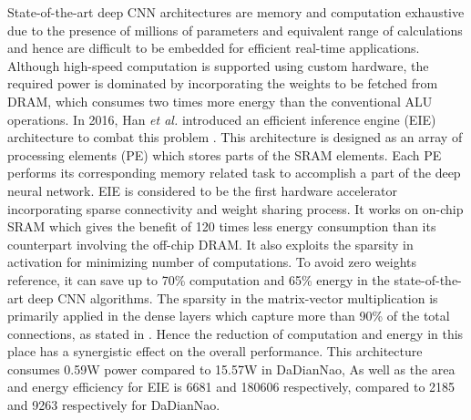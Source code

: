 \documentclass[journal]{IEEEtran}
\begin{document}
\par State-of-the-art deep CNN architectures are memory and computation exhaustive due to the presence of millions of parameters and equivalent range of calculations and hence are difficult to be embedded for efficient real-time applications. Although high-speed computation is supported using custom hardware, the required power is dominated by incorporating the weights to be fetched from DRAM, which consumes two times more energy than the conventional ALU operations. In 2016, Han \textit{et al.} introduced an efficient inference engine (EIE) architecture to combat this problem \cite{paper24}. This architecture is designed as an array of processing elements (PE) which stores parts of the SRAM elements. Each PE performs its corresponding memory related task to accomplish a part of the deep neural network. EIE is considered to be the first hardware accelerator incorporating sparse connectivity and weight sharing process. It works on on-chip SRAM which gives the benefit of 120 times less energy consumption than its counterpart involving the off-chip DRAM. It also exploits the sparsity in activation for minimizing number of computations. To avoid zero weights reference, it can save up to 70\% computation and 65\% energy in the state-of-the-art deep CNN algorithms. The sparsity in the matrix-vector multiplication is primarily applied in the dense layers which capture more than 90\% of the total connections, as stated in \cite{paper6}. Hence the reduction of computation and energy in this place has a synergistic effect on the overall performance. This architecture consumes 0.59W power compared to 15.57W in DaDianNao, As well as the area and energy efficiency for EIE is 6681 and 180606 respectively, compared to 2185 and 9263 respectively for DaDianNao.
\end{document}
